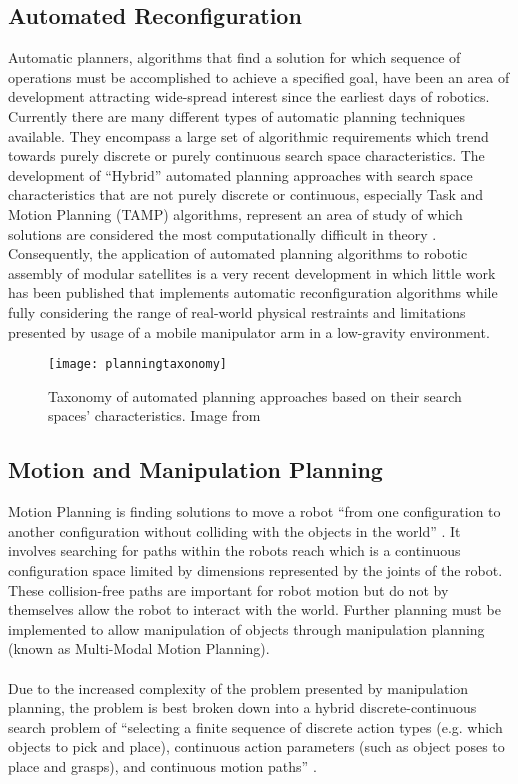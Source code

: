 \subsection{Automated Reconfiguration}
Automatic planners, algorithms that find a solution for which sequence of operations must be accomplished to achieve a specified goal, have been an area of development attracting wide-spread interest since the earliest days of robotics. Currently there are many different types of automatic planning techniques available. They encompass a large set of algorithmic requirements which trend towards purely discrete or purely continuous search space characteristics. The development of “Hybrid” automated planning approaches with search space characteristics that are not purely discrete or continuous, especially Task and Motion Planning (TAMP) algorithms, represent an area of study of which solutions are considered the most computationally difficult in theory \cite{Deshpande2020}. Consequently, the application of automated planning algorithms to robotic assembly of modular satellites is a very recent development in which little work has been published that implements automatic reconfiguration algorithms while fully considering the range of real-world physical restraints and limitations presented by usage of a mobile manipulator arm in a low-gravity environment.
\begin{figure*}[!t]
	\centering
	\texttt{[image: planningtaxonomy]}
	\caption{Taxonomy of automated planning approaches based on their search spaces’ characteristics. Image from \cite{huang2023algorithmic}}
	\label{taxonomy}
\end{figure*}
\subsection{Motion and Manipulation Planning}
Motion Planning is finding solutions to move a robot “from one configuration to another configuration without colliding with the objects in the world” \cite{huang2023algorithmic}. It involves searching for paths within the robots reach which is a continuous configuration space limited by dimensions represented by the joints of the robot. These collision-free paths are important for robot motion but do not by themselves allow the robot to interact with the world. Further planning must be implemented to allow manipulation of objects through manipulation planning (known as Multi-Modal Motion Planning).
\\\\
Due to the increased complexity of the problem presented by manipulation planning, the problem is best broken down into a hybrid discrete-continuous search problem of “selecting a finite sequence of discrete action types (e.g. which objects to pick and place), continuous action parameters (such as object poses to place and grasps), and continuous motion paths” \cite{huang2023algorithmic}.
